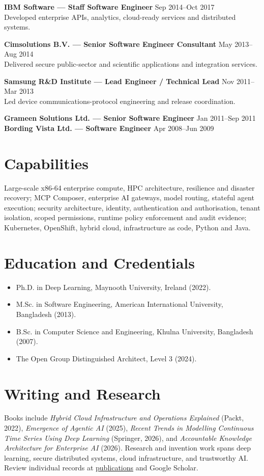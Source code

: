 \documentclass[11pt,a4paper]{article}
\begin{document}
\textbf{IBM Software --- Staff Software Engineer} \hfill Sep 2014--Oct 2017\\
Developed enterprise APIs, analytics, cloud-ready services and distributed systems.

\textbf{Cimsolutions B.V. --- Senior Software Engineer Consultant} \hfill May 2013--Aug 2014\\
Delivered secure public-sector and scientific applications and integration services.

\textbf{Samsung R\&D Institute --- Lead Engineer / Technical Lead} \hfill Nov 2011--Mar 2013\\
Led device communications-protocol engineering and release coordination.

\textbf{Grameen Solutions Ltd. --- Senior Software Engineer} \hfill Jan 2011--Sep 2011\\
\textbf{Bording Vista Ltd. --- Software Engineer} \hfill Apr 2008--Jun 2009

\section*{Capabilities}
Large-scale x86-64 enterprise compute, HPC architecture, resilience and disaster recovery; MCP Composer, enterprise AI gateways, model routing, stateful agent execution; security architecture, identity, authentication and authorisation, tenant isolation, scoped permissions, runtime policy enforcement and audit evidence; Kubernetes, OpenShift, hybrid cloud, infrastructure as code, Python and Java.
\section*{Education and Credentials}
\begin{itemize}
\item Ph.D. in Deep Learning, Maynooth University, Ireland (2022).
\item M.Sc. in Software Engineering, American International University, Bangladesh (2013).
\item B.Sc. in Computer Science and Engineering, Khulna University, Bangladesh (2007).
\item The Open Group Distinguished Architect, Level 3 (2024).
\end{itemize}
\section*{Writing and Research}
Books include \emph{Hybrid Cloud Infrastructure and Operations Explained} (Packt, 2022), \emph{Emergence of Agentic AI} (2025), \emph{Recent Trends in Modelling Continuous Time Series Using Deep Learning} (Springer, 2026), and \emph{Accountable Knowledge Architecture for Enterprise AI} (2026). Research and invention work spans deep learning, secure distributed systems, cloud infrastructure, and trustworthy AI. Review individual records at \href{https://mansura-habiba.github.io/publications}{publications} and Google Scholar.
\end{document}
